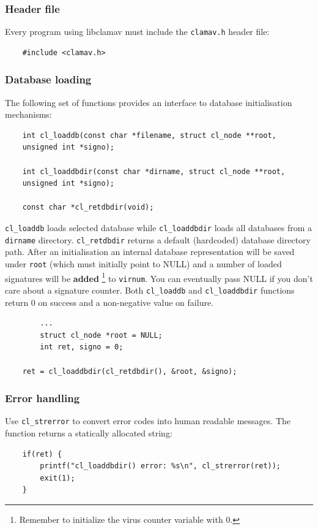 \documentclass[a4paper,titlepage,12pt]{article}
\begin{document}
    \subsubsection{Header file}
    Every program using libclamav must include the \verb+clamav.h+ header
    file:
    \begin{verbatim}
	#include <clamav.h>
    \end{verbatim}

    \subsubsection{Database loading}
    The following set of functions provides an interface to database
    initialisation mechanisms:
    \begin{verbatim}
	int cl_loaddb(const char *filename, struct cl_node **root,
	unsigned int *signo);

	int cl_loaddbdir(const char *dirname, struct cl_node **root,
	unsigned int *signo);

	const char *cl_retdbdir(void);
    \end{verbatim}
    \verb+cl_loaddb+ loads selected database while \verb+cl_loaddbdir+
    loads all databases from a \verb+dirname+ directory. \verb+cl_retdbdir+
    returns a default (hardcoded) database directory path. After an
    initialisation an internal database representation will be saved
    under \verb+root+ (which must initially point to NULL) and a number of
    loaded signatures will be \textbf{added} \footnote{Remember to initialize
    the virus counter variable with 0.} to \verb+virnum+. You can eventually
    pass NULL if you don't care about a signature counter. Both \verb+cl_loaddb+
    and \verb+cl_loaddbdir+ functions return 0 on success and a non-negative
    value on failure.
    \begin{verbatim}
	    ...
	    struct cl_node *root = NULL;
	    int ret, signo = 0;

	ret = cl_loaddbdir(cl_retdbdir(), &root, &signo);
    \end{verbatim}

    \subsubsection{Error handling}
    Use \verb+cl_strerror+ to convert error codes into human readable messages.
    The function returns a statically allocated string:
    \begin{verbatim}
	if(ret) {
	    printf("cl_loaddbdir() error: %s\n", cl_strerror(ret));
	    exit(1);
	}
    \end{verbatim}
\end{document}
